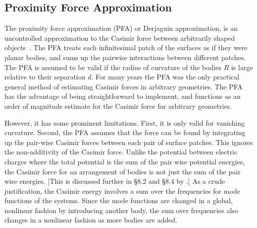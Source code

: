 \subsection{Proximity Force Approximation}
\label{sec:PFA}
The proximity force approximation (PFA) or Derjaguin approximation, is an uncontrolled approximation to
the Casimir force between arbitrarily shaped objects~\citep{Derjaguin1934, Blocki1977}.  
The PFA treats each infinitesimal patch of the surfaces as if they were planar bodies,
and sums up the pairwise interactions between different patches.
The PFA is assumed to be valid if the radius of curvature of the bodies $R$ is large relative to 
their separation $d$.  
For many years the PFA was the only practical general method of estimating Casimir forces in arbitrary geometries.
The PFA has the advantage of being straightforward to implement, and functions as an order of magnitude
estimate for the Casimir force for arbitrary geometries.

However, it has some prominent limitations.  First, it is only valid for vanishing curvature.
Second, the PFA assumes that the force can be found by integrating up
the pair-wise Casimir forces between each pair of surface patches.  This ignores the non-additivity
of the Casimir force.  Unlike the potential between electric charges where the total potential is
the sum of the pair wise potential energies, the Casimir force for an arrangement
of bodies is not just the sum of the pair wise energies. [This is discussed further in \S{8.2} and \S{8.4} by \citet{Milonni1994}.]
As a crude justification, the Casimir energy involves a sum over the frequencies for mode functions 
of the systems.  Since the mode functions are changed in a global, nonlinear fashion by introducing another
body, the sum over frequencies also changes in a nonlinear fashion as more bodies are added.  


